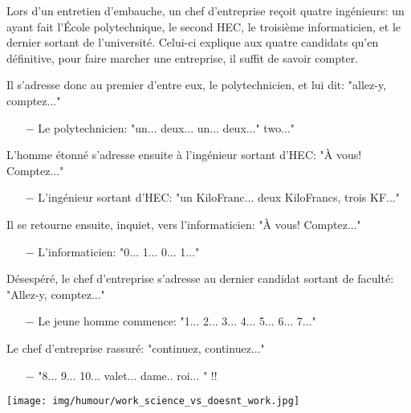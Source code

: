 Lors d'un entretien d'embauche, un chef d'entreprise reçoit quatre ingénieurs: un ayant fait l'École polytechnique, le second HEC, le troisième informaticien, et le dernier sortant de l'université. Celui-ci explique aux quatre candidats qu'en définitive, pour faire marcher une entreprise, il suffit de savoir compter.

Il s'adresse donc au premier d'entre eux, le polytechnicien, et lui dit: "allez-y, comptez..."

\begin{itemize}	 
	\item[$-$] Le polytechnicien: "un... deux... un... deux..." two..."
\end{itemize}


L'homme étonné s'adresse ensuite à l'ingénieur sortant d'HEC: "À vous! Comptez..."

\begin{itemize}	 
	\item[$-$] L'ingénieur sortant d'HEC: "un KiloFranc... deux KiloFrancs, trois KF..."
\end{itemize} 


Il se retourne ensuite, inquiet, vers l'informaticien: "À vous! Comptez..."

\begin{itemize}	 
	\item[$-$] L'informaticien: "0... 1... 0... 1..." 
\end{itemize}

Désespéré, le chef d'entreprise s'adresse au dernier candidat sortant de faculté: "Allez-y, comptez..."

\begin{itemize}	 
	\item[$-$] Le jeune homme commence: "1... 2... 3... 4... 5... 6... 7..." 
\end{itemize}

Le chef d'entreprise rassuré: "continuez, continuez..."

\begin{itemize}	 
	\item[$-$] "8... 9... 10... valet... dame.. roi... " !!
\end{itemize}

	\begin{center}\underline{\hspace{5 cm}}\end{center}

	\begin{center}
		\texttt{[image: img/humour/work\_science\_vs\_doesnt\_work.jpg]}	
	\end{center}
	\pagebreak

